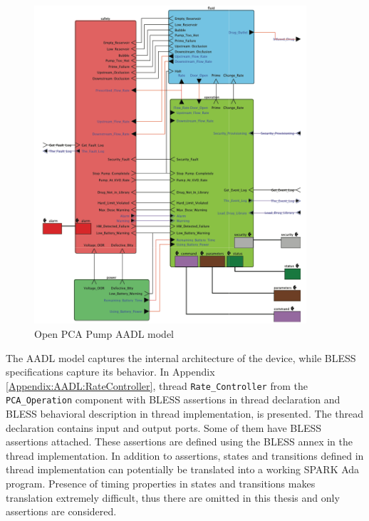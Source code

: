 \begin{figure}%
    \begin{center}
      \includegraphics[width=0.9\textwidth]{figures/pca-pump-aadl-model.png}      
    \end{center}
    \caption{Open PCA Pump AADL model}
    \label{figure:pca-pump-aadl-model}
\end{figure}

The AADL model captures the internal architecture of the device, while BLESS specifications capture its behavior. In Appendix \ref{Appendix:AADL:RateController}, thread \lstinline{Rate_Controller} from the \lstinline{PCA_Operation} component with BLESS assertions in thread declaration and BLESS behavioral description in thread implementation, is presented. The thread declaration contains input and output ports. Some of them have BLESS assertions attached. These assertions are defined using the BLESS annex in the thread implementation. In addition to assertions, states and transitions defined in thread implementation can potentially be translated into a working SPARK Ada program. Presence of timing properties in states and transitions makes translation extremely difficult, thus there are omitted in this thesis and only assertions are considered.


